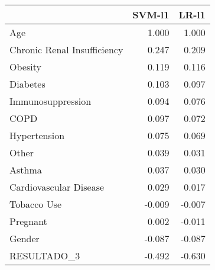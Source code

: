 \begin{tabular}{lrr}
\toprule
{} &  SVM-l1 &  LR-l1 \\
\midrule
Age                         &   1.000 &  1.000 \\
Chronic Renal Insufficiency &   0.247 &  0.209 \\
Obesity                     &   0.119 &  0.116 \\
Diabetes                    &   0.103 &  0.097 \\
Immunosuppression           &   0.094 &  0.076 \\
COPD                        &   0.097 &  0.072 \\
Hypertension                &   0.075 &  0.069 \\
Other                       &   0.039 &  0.031 \\
Asthma                      &   0.037 &  0.030 \\
Cardiovascular Disease      &   0.029 &  0.017 \\
Tobacco Use                 &  -0.009 & -0.007 \\
Pregnant                    &   0.002 & -0.011 \\
Gender                      &  -0.087 & -0.087 \\
RESULTADO\_3                 &  -0.492 & -0.630 \\
\bottomrule
\end{tabular}
